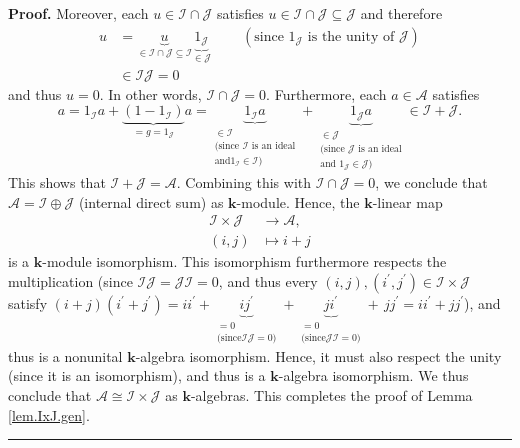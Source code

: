 \documentclass[numbers=enddot,12pt,final,onecolumn,notitlepage]{scrartcl}%
\numberwithin{exer}{subsection}
\theoremstyle{definition}
\newenvironment{proof}[1][Proof]{\noindent\textbf{#1.} }{\ \rule{0.5em}{0.5em}}
\begin{document}
\begin{proof}
Moreover, each $u\in\mathcal{I}\cap\mathcal{J}$ satisfies $u\in\mathcal{I}%
\cap\mathcal{J}\subseteq\mathcal{J}$ and therefore%
\begin{align*}
u  &  =\underbrace{u}_{\in\mathcal{I}\cap\mathcal{J}\subseteq\mathcal{I}%
}\underbrace{1_{\mathcal{J}}}_{\in\mathcal{J}}\ \ \ \ \ \ \ \ \ \ \left(
\text{since }1_{\mathcal{J}}\text{ is the unity of }\mathcal{J}\right) \\
&  \in\mathcal{IJ}=0
\end{align*}
and thus $u=0$. In other words, $\mathcal{I}\cap\mathcal{J}=0$. Furthermore,
each $a\in\mathcal{A}$ satisfies%
\[
a=1_{\mathcal{I}}a+\underbrace{\left(  1-1_{\mathcal{I}}\right)
}_{=g=1_{\mathcal{J}}}a=\underbrace{1_{\mathcal{I}}a}_{\substack{\in
\mathcal{I}\\\text{(since }\mathcal{I}\text{ is an ideal}\\\text{and
}1_{\mathcal{I}}\in\mathcal{I}\text{)}}}+\underbrace{1_{\mathcal{J}}%
a}_{\substack{\in\mathcal{J}\\\text{(since }\mathcal{J}\text{ is an
ideal}\\\text{and }1_{\mathcal{J}}\in\mathcal{J}\text{)}}}\in\mathcal{I}%
+\mathcal{J}.
\]
This shows that $\mathcal{I}+\mathcal{J}=\mathcal{A}$. Combining this with
$\mathcal{I}\cap\mathcal{J}=0$, we conclude that $\mathcal{A}=\mathcal{I}%
\oplus\mathcal{J}$ (internal direct sum) as $\mathbf{k}$-module. Hence, the
$\mathbf{k}$-linear map%
\begin{align*}
\mathcal{I}\times\mathcal{J}  &  \rightarrow\mathcal{A},\\
\left(  i,j\right)   &  \mapsto i+j
\end{align*}
is a $\mathbf{k}$-module isomorphism. This isomorphism furthermore respects
the multiplication (since $\mathcal{IJ}=\mathcal{JI}=0$, and thus every
$\left(  i,j\right)  ,\left(  i^{\prime},j^{\prime}\right)  \in\mathcal{I}%
\times\mathcal{J}$ satisfy $\left(  i+j\right)  \left(  i^{\prime}+j^{\prime
}\right)  =ii^{\prime}+\underbrace{ij^{\prime}}_{\substack{=0\\\text{(since
}\mathcal{IJ}=0\text{)}}}+\underbrace{ji^{\prime}}_{\substack{=0\\\text{(since
}\mathcal{JI}=0\text{)}}}+\,jj^{\prime}=ii^{\prime}+jj^{\prime}$), and thus is
a nonunital $\mathbf{k}$-algebra isomorphism. Hence, it must also respect the
unity (since it is an isomorphism), and thus is a $\mathbf{k}$-algebra
isomorphism. We thus conclude that $\mathcal{A}\cong\mathcal{I}\times
\mathcal{J}$ as $\mathbf{k}$-algebras. This completes the proof of Lemma
\ref{lem.IxJ.gen}.
\end{proof}
\end{document}
